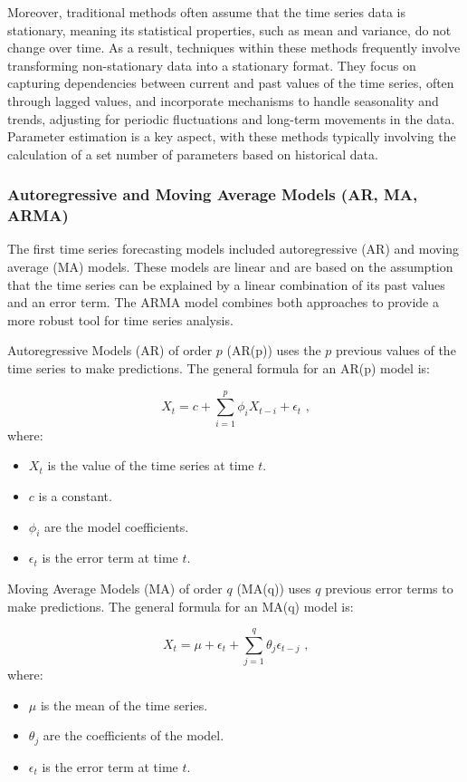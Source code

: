 Moreover, traditional methods often assume that the time series data is stationary, meaning its statistical properties, such as mean and variance, do not change over time. As a result, techniques within these methods frequently involve transforming non-stationary data into a stationary format. They focus on capturing dependencies between current and past values of the time series, often through lagged values, and incorporate mechanisms to handle seasonality and trends, adjusting for periodic fluctuations and long-term movements in the data. Parameter estimation is a key aspect, with these methods typically involving the calculation of a set number of parameters based on historical data.
\vspace{10pt}

\subsubsection{Autoregressive and Moving Average Models (AR, MA, ARMA)}

The first time series forecasting models included autoregressive (AR) and moving average (MA) models. These models are linear and are based on the assumption that the time series can be explained by a linear combination of its past values and an error term. The ARMA model combines both approaches to provide a more robust tool for time series analysis.

Autoregressive Models (AR) of order \( p \) (AR(p)) uses the \( p \) previous values of the time series to make predictions. The general formula for an AR(p) model is:

\begin{equation}
X_t = c + \sum_{i=1}^{p} \phi_i X_{t-i} + \epsilon_t \text{ ,}
\end{equation}where:
\begin{itemize}
    \item \( X_t \) is the value of the time series at time \( t \).
    \item \( c \) is a constant.
    \item \( \phi_i \) are the model coefficients.
    \item \( \epsilon_t \) is the error term at time \( t \).
\end{itemize}

Moving Average Models (MA) of order \( q \) (MA(q)) uses \( q \) previous error terms to make predictions. The general formula for an MA(q) model is:

\begin{equation}
X_t = \mu + \epsilon_t + \sum_{j=1}^{q} \theta_j \epsilon_{t-j} \text{ ,}
\end{equation}where:
\begin{itemize}
    \item \( \mu \) is the mean of the time series.
    \item \( \theta_j \) are the coefficients of the model.
    \item \( \epsilon_t \) is the error term at time \( t \).
\end{itemize}

